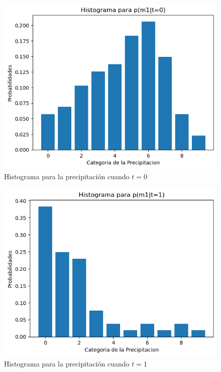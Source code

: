 \documentclass[spanish,english]{article}
\begin{document}
\begin{enumerate}
%
\begin{figure}[hbtp!]
    \centering
    \includegraphics[width=0.75\linewidth]{Quiz_2//Imagenes/histograma_precipitacion_t0.png}
    \caption{Histograma para la precipitaci\'{on} cuando $t = 0$}
    \label{fig:hist_precipitacion_t0}
\end{figure}\newpage

%
\begin{figure}[hbtp!]
    \centering
    \includegraphics[width=0.75\linewidth]{Quiz_2//Imagenes/histograma_precipitacion_t1.png}
    \caption{Histograma para la precipitaci\'{on} cuando $t = 1$}
    \label{fig:hist_precipitacion_t1}
\end{figure}


\end{enumerate}
\end{document}

